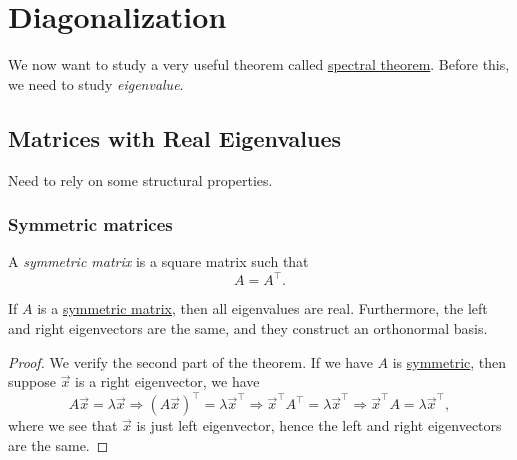 \chapter{Diagonalization}
We now want to study a very useful theorem called \hyperref[thm:spectral-theorem]{spectral theorem}. Before this, we need to study \emph{eigenvalue}.
\section{Matrices with Real Eigenvalues}
Need to rely on some structural properties.

\subsection{Symmetric matrices}
\begin{definition}\label{def:symmetric-matrix}
	A \emph{symmetric matrix} is a square matrix such that
	\[
		A = A^{\top}.
	\]
\end{definition}

\begin{theorem}\label{thm:spectral-theorem}
	If \(A\) is a \hyperref[def:symmetric-matrix]{symmetric matrix}, then all eigenvalues are real. Furthermore, the left and right
	eigenvectors are the same, and they construct an orthonormal basis.
\end{theorem}
\begin{proof}
	We verify the second part of the theorem.  If we have \(A\) is \hyperref[def:symmetric-matrix]{symmetric}, then suppose \(\vec{x} \) is a right eigenvector,
	we have
	\[
		A \vec{x} = \lambda \vec{x}\Rightarrow
		(A \vec{x})^{\top} = \lambda \vec{x}^{\top}\Rightarrow
		\vec{x}^{\top} A^{\top} = \lambda\vec{x}^{\top}\Rightarrow
		\vec{x}^{\top} A = \lambda\vec{x}^{\top},
	\]
	where we see that \(\vec{x}\) is just left eigenvector, hence the left and right eigenvectors are the same.
\end{proof}
